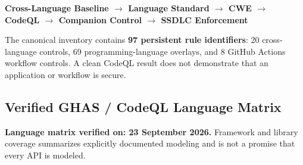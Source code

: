\documentclass[10pt,letterpaper]{article}
\begin{document}
\begin{center}\textbf{Cross-Language Baseline $\rightarrow$ Language Standard $\rightarrow$ CWE $\rightarrow$ CodeQL $\rightarrow$ Companion Control $\rightarrow$ SSDLC Enforcement}\end{center}

The canonical inventory contains \textbf{97 persistent rule identifiers}: 20 cross-language controls, 69 programming-language overlays, and 8 GitHub Actions workflow controls. A clean CodeQL result does not demonstrate that an application or workflow is secure.

\begin{landscape}
\section{Verified GHAS / CodeQL Language Matrix}
\textbf{Language matrix verified on: 23 September 2026.} Framework and library coverage summarizes explicitly documented modeling and is not a promise that every API is modeled.


\end{landscape}
\end{document}
